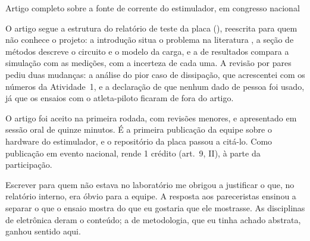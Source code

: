 \begin{atividade}{Artigo completo sobre a fonte de corrente do estimulador, em congresso nacional}
\begin{desenvolvimento}
O artigo segue a estrutura do relatório de teste da placa (), reescrita para quem
não conhece o projeto: a introdução situa o problema na literatura \parencite{merrill2005}, a seção de
métodos descreve o circuito e o modelo da carga, e a de resultados compara a simulação com as medições,
com a incerteza de cada uma. A revisão por pares pediu duas mudanças: a análise do pior caso de
dissipação, que acrescentei com os números da Atividade~1, e a declaração de que nenhum dado de pessoa
foi usado, já que os ensaios com o atleta-piloto ficaram de fora do artigo.
\end{desenvolvimento}

\begin{resultados}
O artigo foi aceito na primeira rodada, com revisões menores, e apresentado em sessão oral de quinze
minutos. É a primeira publicação da equipe sobre o hardware do estimulador, e o repositório da placa
passou a citá-lo. Como publicação em evento nacional, rende 1 crédito (art.~9\textordmasculine, II), à
parte da participação.
\end{resultados}

\begin{evidencias}
\end{evidencias}

\begin{aprendizados}
Escrever para quem não estava no laboratório me obrigou a justificar o que, no relatório interno, era
óbvio para a equipe. A resposta aos pareceristas ensinou a separar o que o ensaio mostra do que eu
gostaria que ele mostrasse. As disciplinas de eletrônica deram o conteúdo; a de metodologia, que eu
tinha achado abstrata, ganhou sentido aqui.
\end{aprendizados}
\end{atividade}

